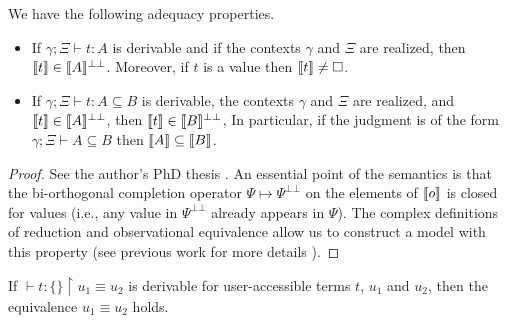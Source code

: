 \begin{theorem}[adequacy]
  We have the following adequacy properties.
  \begin{itemize}
    \item If $\gamma; \Xi \vdash t : A$ is derivable and if the contexts
          $\gamma$ and $\Xi$ are realized, then $\llbracket t \rrbracket
          \in \llbracket A \rrbracket^{\bot\bot}$. Moreover, if $t$ is a
          value then $\llbracket t \rrbracket \not= \square$.
    \item If $\gamma; \Xi \vdash t : A \subseteq B$ is derivable, the contexts
          $\gamma$ and $\Xi$ are realized, and $\llbracket t \rrbracket
          \in \llbracket A \rrbracket^{\bot\bot}$, then $\llbracket t
          \rrbracket \in \llbracket B \rrbracket^{\bot\bot}$, In particular,
          if the judgment is of the form $\gamma; \Xi \vdash A \subseteq B$
          then $\llbracket A \rrbracket \subseteq \llbracket B \rrbracket$.
  \end{itemize}
\end{theorem}
\begin{proof}
  See the author's PhD thesis \cite[Chapter~4]{Lepigre2017PhD}. An essential
  point of the semantics is that the bi-orthogonal completion operator
  $\Psi \mapsto \Psi^{\bot\bot}$ on the elements of $\llbracket o \rrbracket$
  is closed for values (i.e., any value in $\Psi^{\bot\bot}$ already appears
  in $\Psi$). The complex definitions of reduction and observational
  equivalence allow us to construct a model with this property (see previous
  work for more details \cite{Lepigre2016,Lepigre2017PhD}).
\end{proof}
\begin{corollary}
  If $\vdash t : \{\} \restriction u_1 \equiv u_2$ is derivable for
  user-accessible terms $t$, $u_1$ and $u_2$, then the equivalence
  $u_1 \equiv u_2$ holds.
\end{corollary}
